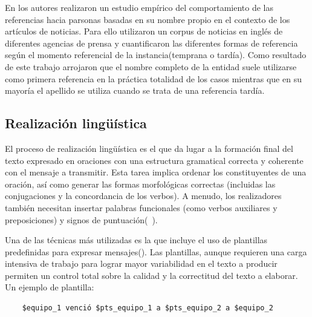     En \cite{siddharthan2011information} los autores realizaron un estudio emp\'irico del comportamiento de las referencias hacia parsonas basadas en 
su nombre propio en el contexto de los art\'iculos de noticias. Para ello utilizaron un corpus de noticias en inglés de diferentes agencias de prensa y 
cuantificaron las diferentes formas de referencia seg\'un el momento referencial de la instancia(temprana o tard\'ia). Como resultado de este trabajo 
arrojaron que el nombre completo de la entidad suele utilizarse como primera referencia en la pr\'actica totalidad de los casos mientras que en su mayor\'ia
el apellido se utiliza cuando se trata de una referencia tard\'ia. 


\subsection{Realización lingüística}

    El proceso de realizaci\'on lingüística es el que da lugar a la formaci\'on final del texto expresado en oraciones con una 
estructura gramatical correcta y coherente con el mensaje a transmitir. Esta tarea implica ordenar los constituyentes de una oración, 
así como generar las formas morfológicas correctas (incluidas las conjugaciones y la concordancia de los verbos). A menudo, los 
realizadores también necesitan insertar palabras funcionales (como verbos auxiliares y preposiciones) y signos de puntuación(~\cite{Gatt2018SurveyOT}).
   
    Una de las t\'ecnicas m\'as utilizadas es la que incluye el uso de plantillas predefinidas para expresar mensajes(\cite{Gatt2018SurveyOT}). Las 
plantillas, aunque requieren una carga intensiva de trabajo para lograr mayor variabilidad en el texto a producir permiten un control total sobre 
la calidad y la correctitud del texto a elaborar. Un ejemplo de plantilla:

\begin{verbatim}
    $equipo_1 venció $pts_equipo_1 a $pts_equipo_2 a $equipo_2
\end{verbatim}

